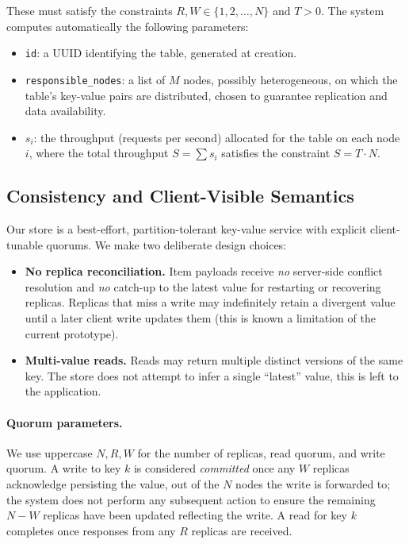 These must satisfy the constraints $R, W \in \{ 1, 2, \dots, N \}$ and $T > 0$.
%
The system computes automatically the following parameters:
\begin{itemize}
    \item \texttt{id}: a UUID identifying the table, generated at creation.
    \item \texttt{responsible\_nodes}: a list of $M$ nodes, possibly
        heterogeneous, on which the table's key-value pairs are distributed,
        chosen to guarantee replication and data availability.
    \item $s_i$: the throughput (requests per second) allocated for the table on each node $i$,
      where the total throughput $S = \sum s_i$ satisfies the constraint
      $S = T \cdot N$.
\end{itemize}

\subsection{Consistency and Client-Visible Semantics}
\label{subsec:consistency}

Our store is a best-effort, partition-tolerant key-value service with explicit
client-tunable quorums. We make two deliberate design choices:

\begin{itemize}
    \item \textbf{No replica reconciliation.}
        Item payloads receive \emph{no} server-side conflict resolution and
        \emph{no} catch-up to the latest value for restarting or recovering
        replicas.
        Replicas that miss a write may indefinitely retain a divergent value
        until a later client write updates them (this is known a limitation of
        the current prototype).
    \item \textbf{Multi-value reads.}
        Reads may return multiple distinct versions of the same key.
        The store does not attempt to infer a single ``latest'' value, this is
        left to the application.
\end{itemize}

\paragraph{Quorum parameters.}
We use uppercase $N, R, W$ for the number of replicas, read quorum, and write
quorum.
A write to key $k$ is considered \emph{committed} once any $W$ replicas
acknowledge persisting the value, out of the $N$ nodes the write is forwarded to;
the system does not perform any subsequent action to ensure the remaining $N - W$ replicas
have been updated reflecting the write.
A read for key $k$ completes once responses from any $R$ replicas are received.

